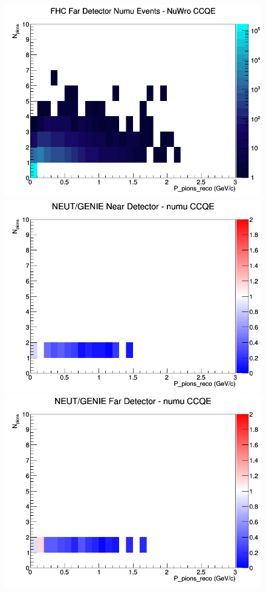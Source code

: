 \documentclass[12pt]{article}
\begin{document}
\begin{figure}[h]
\endminipage
{}
\includegraphics[width=\linewidth]{eff_N_P/GAr/pions/CCQE_FHC_FD_numu_N_P_NuWro.png}
\endminipage
\newline
{}
\includegraphics[width=\linewidth]{eff_N_P/GAr/pions/ratios/CCQE_NEUT_GENIE_numu_near_N_P.png}
\endminipage
{}
\includegraphics[width=\linewidth]{eff_N_P/GAr/pions/ratios/CCQE_NEUT_GENIE_numu_far_N_P.png}

\end{figure}
\end{document}
